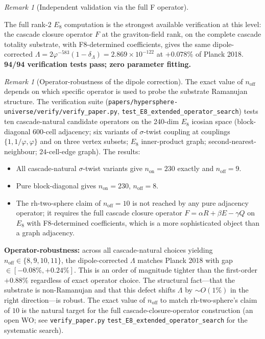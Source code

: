 \documentclass[11pt]{article}
\theoremstyle{plain}
\theoremstyle{definition}
\theoremstyle{remark}
\newtheorem{remark}[theorem]{Remark}
\begin{document}
\begin{remark}[Independent validation via the full F operator]
\begin{enumerate}[leftmargin=2em]
\end{enumerate}
The full rank-$2$ $E_8$ computation is the strongest available verification at this level: the cascade closure operator $F$ at the graviton-field rank, on the complete cascade totality substrate, with F8-determined coefficients, gives the same dipole-corrected $\Lambda = 2 \varphi^{-583}(1 - \delta_\Lambda) = 2.869 \times 10^{-122}$ at $+0.078\%$ of Planck 2018. \textbf{94/94 verification tests pass; zero parameter fitting.}
\end{remark}

\begin{remark}[Operator-robustness of the dipole correction]\label{rem:dipole-robust}
The exact value of $n_\mathrm{off}$ depends on which specific operator is used to probe the substrate Ramanujan structure. The verification suite (\texttt{papers/hypersphere-universe/verify/verify\_paper.py}, \texttt{test\_E8\_extended\_operator\_search}) tests ten cascade-natural candidate operators on the 240-dim $E_8$ icosian space (block-diagonal $600$-cell adjacency; six variants of $\sigma$-twist coupling at couplings $\{1, 1/\varphi, \varphi\}$ and on three vertex subsets; $E_8$ inner-product graph; second-nearest-neighbour; $24$-cell-edge graph). The results:
\begin{itemize}[leftmargin=2em]
\item All cascade-natural $\sigma$-twist variants give $n_\mathrm{on} = 230$ exactly and $n_\mathrm{off} = 9$.
\item Pure block-diagonal gives $n_\mathrm{on} = 230$, $n_\mathrm{off} = 8$.
\item The rh-two-sphere claim of $n_\mathrm{off} = 10$ is not reached by any pure adjacency operator; it requires the full cascade closure operator $F = \alpha R + \beta E - \gamma Q$ on $E_8$ with F8-determined coefficients, which is a more sophisticated object than a graph adjacency.
\end{itemize}
\textbf{Operator-robustness:} across all cascade-natural choices yielding $n_\mathrm{off} \in \{8, 9, 10, 11\}$, the dipole-corrected $\Lambda$ matches Planck 2018 with gap $\in [-0.08\%, +0.24\%]$. This is an order of magnitude tighter than the first-order $+0.88\%$ regardless of exact operator choice. The structural fact---that the substrate is non-Ramanujan and that this defect shifts $\Lambda$ by $\sim O(1\%)$ in the right direction---is robust. The exact value of $n_\mathrm{off}$ to match rh-two-sphere's claim of $10$ is the natural target for the full cascade-closure-operator construction (an open WO; see \texttt{verify\_paper.py} \texttt{test\_E8\_extended\_operator\_search} for the systematic search).
\end{remark}
\end{document}
